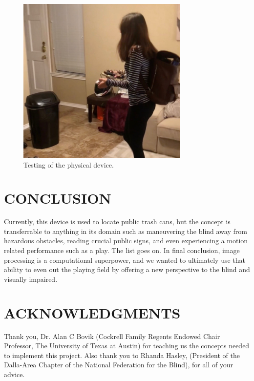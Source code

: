 \documentclass{article}
\begin{document}
\begin{center}
\begin{figure}[ht]

\begin{minipage}[b]{1.0\linewidth}
  \centering
  \centerline{\includegraphics[width=8.5cm]{thedemo.jpg}}
\end{minipage}
\caption{Testing of the physical device.}
\label{figures3}
%
\end{figure}
\end{center}




\section{CONCLUSION}
\label{sec:conclusion}

Currently, this device is used to locate public trash cans, but the concept is transferrable to anything in its domain such as maneuvering the blind away from hazardous obstacles, reading crucial public signs, and even experiencing a motion related performance such as a play. The list goes on. In final conclusion, image processing is a computational superpower, and we wanted to ultimately use that ability to even out the playing field by offering a new perspective to the blind and visually impaired. 

\section{ACKNOWLEDGMENTS}
\label{sec:ack}

Thank you, Dr. Alan C Bovik (Cockrell Family Regents Endowed Chair Professor, The University of Texas at Austin) for teaching us the concepts needed to implement this project. Also thank you to Rhanda Hasley, (President of the Dalla-Area Chapter of the National Federation for the Blind), for all of your advice.
\end{document}
